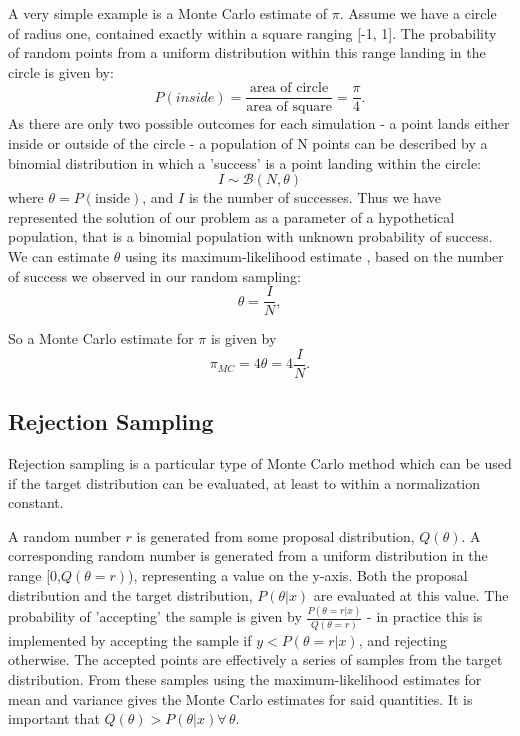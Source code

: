 \documentclass[a4paper,11pt,twoside]{article}
\begin{document}
A very simple example is a Monte Carlo estimate of $\pi$. Assume we have a
circle of radius one, contained exactly within a square ranging [-1, 1]. The
probability of random points from a uniform distribution within this range
landing in the circle is given by:
\begin{equation}
	P(inside) = \frac{\text{area of circle}}{\text{area of square}} =
	\frac{\pi}{4}.
\end{equation}
As there are only two possible outcomes for each simulation - a point lands
either inside or outside of the circle - a  population of N points can be
described by a binomial distribution in which a 'success' is a point landing within
the circle:
\begin{equation}
	I \sim \mathcal{B}(N, \theta)
\end{equation}
where $\theta = P(\text{inside})$, and $I$ is the number of successes.
Thus we have represented the solution of our problem as a parameter of a
hypothetical population, that is a binomial population with unknown probability
of success.
We can estimate $\theta$ using its maximum-likelihood estimate \cite{som}, based
on the number of success we observed in our random sampling:
\begin{equation}
	\theta = \frac{I}{N},
\end{equation}

So a Monte Carlo estimate for $\pi$ is given by
\begin{equation}
	\pi_{MC} = 4 \theta = 4 \frac{I}{N}.
\end{equation}

\subsection{Rejection Sampling}
Rejection sampling is a particular type of Monte Carlo method which can be used
if the target distribution can be evaluated, at least to within a normalization
constant. 

A random number $r$ is generated from some proposal distribution, $Q(\theta)$. A
corresponding random number is generated from a uniform distribution in the
range [0,$Q(\theta = r)$), representing a value on the y-axis. Both the
proposal distribution and the target distribution, $P(\theta|x)$ are
evaluated at this value. The probability of 'accepting' the sample is given by
$\frac{P(\theta = r|x)}{Q(\theta = r)}$ - in practice this is implemented by accepting the
sample if $y < P(\theta = r|x)$, and rejecting otherwise. The accepted points are
effectively a series of samples from the target distribution. From these
samples using the maximum-likelihood estimates for mean and variance gives the
Monte Carlo estimates for said quantities. It is important that $Q(\theta) >
P(\theta|x) \forall \, \theta$. 
\end{document}
